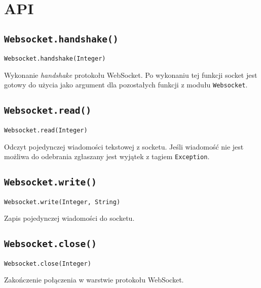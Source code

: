 \section{API}

\subsection{\texttt{Websocket.handshake()}}

\begin{lstlisting}
Websocket.handshake(Integer)
\end{lstlisting}

Wykonanie \emph{handshake} protokołu WebSocket. Po wykonaniu tej funkcji socket
jest gotowy do użycia jako argument dla pozostałych funkcji z modułu
\texttt{Websocket}.

\subsection{\texttt{Websocket.read()}}

\begin{lstlisting}
Websocket.read(Integer)
\end{lstlisting}

Odczyt pojedynczej wiadomości tekstowej z socketu. Jeśli wiadomość nie jest
możliwa do odebrania zgłaszany jest wyjątek z tagiem \texttt{Exception}.

\subsection{\texttt{Websocket.write()}}

\begin{lstlisting}
Websocket.write(Integer, String)
\end{lstlisting}

Zapis pojedynczej wiadomości do socketu.

\subsection{\texttt{Websocket.close()}}

\begin{lstlisting}
Websocket.close(Integer)
\end{lstlisting}

Zakończenie połączenia w warstwie protokołu WebSocket.
